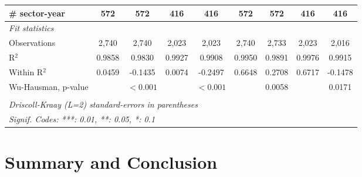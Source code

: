 \documentclass[a4paper]{article}
\begin{document}
\begin{table}[h!]
{\begin{tabular}{lcccccccc}
      \# sector-year                                 & 572            & 572                    & 416          & 416                     & 572            & 572            & 416            & 416\\
            \midrule
      \emph{Fit statistics}\\
      Observations                                   & 2,740          & 2,740                  & 2,023        & 2,023                   & 2,740          & 2,733          & 2,023          & 2,016\\  
      R$^2$                                          & 0.9858         & 0.9830                 & 0.9927       & 0.9908                  & 0.9950         & 0.9891         & 0.9976         & 0.9915\\  
      Within R$^2$                                   & 0.0459         & -0.1435                & 0.0074       & -0.2497                 & 0.6648         & 0.2708         & 0.6717         & -0.1478\\  
      Wu-Hausman, p-value                            &                & $<0.001$  &              & $<0.001$    &                & 0.0058         &                & 0.0171\\ 
      \bottomrule \\ [-0.9em]
      \multicolumn{9}{l}{\emph{Driscoll-Kraay (L=2) standard-errors in parentheses}}\\
      \multicolumn{9}{l}{\emph{Signif. Codes: ***: 0.01, **: 0.05, *: 0.1}}\\
   \end{tabular}
   }
\end{table}
\FloatBarrier






\newpage

\section{Summary and Conclusion} 
\end{document}
